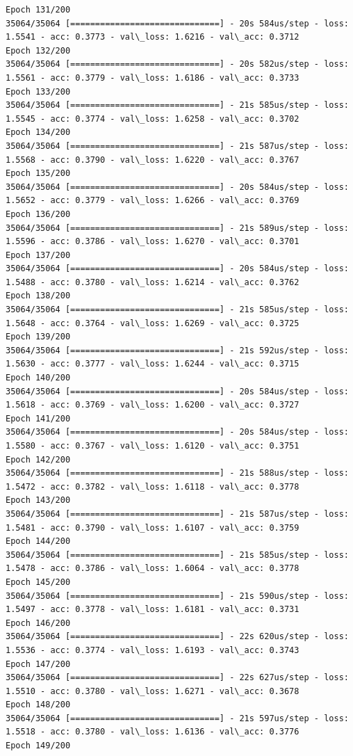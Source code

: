 \documentclass[11pt]{article}
\begin{document}
\begin{Verbatim}[commandchars=\\\{\}]
Epoch 131/200
35064/35064 [==============================] - 20s 584us/step - loss: 1.5541 - acc: 0.3773 - val\_loss: 1.6216 - val\_acc: 0.3712
Epoch 132/200
35064/35064 [==============================] - 20s 582us/step - loss: 1.5561 - acc: 0.3779 - val\_loss: 1.6186 - val\_acc: 0.3733
Epoch 133/200
35064/35064 [==============================] - 21s 585us/step - loss: 1.5545 - acc: 0.3774 - val\_loss: 1.6258 - val\_acc: 0.3702
Epoch 134/200
35064/35064 [==============================] - 21s 587us/step - loss: 1.5568 - acc: 0.3790 - val\_loss: 1.6220 - val\_acc: 0.3767
Epoch 135/200
35064/35064 [==============================] - 20s 584us/step - loss: 1.5652 - acc: 0.3779 - val\_loss: 1.6266 - val\_acc: 0.3769
Epoch 136/200
35064/35064 [==============================] - 21s 589us/step - loss: 1.5596 - acc: 0.3786 - val\_loss: 1.6270 - val\_acc: 0.3701
Epoch 137/200
35064/35064 [==============================] - 20s 584us/step - loss: 1.5488 - acc: 0.3780 - val\_loss: 1.6214 - val\_acc: 0.3762
Epoch 138/200
35064/35064 [==============================] - 21s 585us/step - loss: 1.5648 - acc: 0.3764 - val\_loss: 1.6269 - val\_acc: 0.3725
Epoch 139/200
35064/35064 [==============================] - 21s 592us/step - loss: 1.5630 - acc: 0.3777 - val\_loss: 1.6244 - val\_acc: 0.3715
Epoch 140/200
35064/35064 [==============================] - 20s 584us/step - loss: 1.5618 - acc: 0.3769 - val\_loss: 1.6200 - val\_acc: 0.3727
Epoch 141/200
35064/35064 [==============================] - 20s 584us/step - loss: 1.5580 - acc: 0.3767 - val\_loss: 1.6120 - val\_acc: 0.3751
Epoch 142/200
35064/35064 [==============================] - 21s 588us/step - loss: 1.5472 - acc: 0.3782 - val\_loss: 1.6118 - val\_acc: 0.3778
Epoch 143/200
35064/35064 [==============================] - 21s 587us/step - loss: 1.5481 - acc: 0.3790 - val\_loss: 1.6107 - val\_acc: 0.3759
Epoch 144/200
35064/35064 [==============================] - 21s 585us/step - loss: 1.5478 - acc: 0.3786 - val\_loss: 1.6064 - val\_acc: 0.3778
Epoch 145/200
35064/35064 [==============================] - 21s 590us/step - loss: 1.5497 - acc: 0.3778 - val\_loss: 1.6181 - val\_acc: 0.3731
Epoch 146/200
35064/35064 [==============================] - 22s 620us/step - loss: 1.5536 - acc: 0.3774 - val\_loss: 1.6193 - val\_acc: 0.3743
Epoch 147/200
35064/35064 [==============================] - 22s 627us/step - loss: 1.5510 - acc: 0.3780 - val\_loss: 1.6271 - val\_acc: 0.3678
Epoch 148/200
35064/35064 [==============================] - 21s 597us/step - loss: 1.5518 - acc: 0.3780 - val\_loss: 1.6136 - val\_acc: 0.3776
Epoch 149/200

\end{Verbatim}
\end{document}
